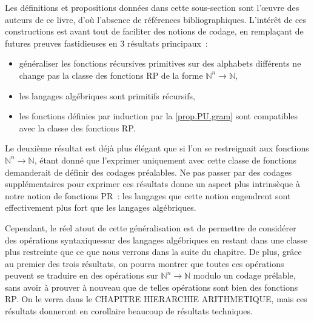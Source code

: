 Les définitions et propositions données dans cette sous-section sont l'\oe uvre
des auteurs de ce livre, d'où l'absence de références bibliographiques.
L'intérêt de ces constructions est avant tout de faciliter des notions de
codage, en remplaçant de futures preuves fastidieuses en 3 résultats
principaux~:
\begin{itemize}
\item généraliser les fonctions récursives primitives sur des alphabets
  différents ne change pas la classe des fonctions RP de la forme
  $\mathbb N^n \to \mathbb N$,
\item les langages algébriques sont primitifs récursifs,
\item les fonctions définies par induction par la \cref{prop.PU.gram} sont
  compatibles avec la classe des fonctions RP.
\end{itemize}
Le deuxième résultat est déjà plus élégant que si l'on se restreignait aux
fonctions $\mathbb N^n \to \mathbb N$, étant donné que l'exprimer uniquement
avec cette classe de fonctions demanderait de définir des codages préalables.
Ne pas passer par des codages supplémentaires pour exprimer ces résultats donne
un aspect plus intrinsèque à notre notion de fonctions PR~: les langages que
cette notion engendrent sont effectivement plus fort que les langages
algébriques.

Cependant, le réel atout de cette généralisation est de permettre de considérer
des opérations \og syntaxiques\fg sur des langages algébriques en restant dans
une classe plus restreinte que ce que nous verrons dans la suite du chapitre.
De plus, grâce au premier des trois résultats, on pourra montrer que toutes ces
opérations peuvent se traduire en des opérations sur
$\mathbb N^n \to \mathbb N$ modulo un codage prélable, sans avoir à prouver à
nouveau que de telles opérations sont bien des fonctions RP. On le verra dans le
CHAPITRE HIERARCHIE ARITHMETIQUE, mais ces résultats donneront en corollaire
beaucoup de résultats techniques.

